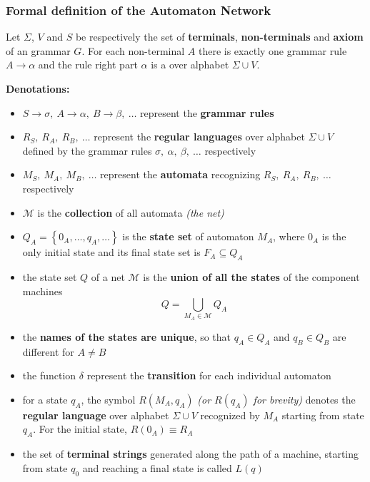 \documentclass[english]{article}
\begin{document}
\subsubsection{Formal definition of the Automaton Network}

Let \(\Sigma\), \(V\) and \(S\) be respectively the set of \textbf{terminals}, \textbf{non-terminals} and \textbf{axiom} of an \EBNF grammar \(G\).
For each non-terminal \(A\) there is exactly one grammar rule \(A \rightarrow \alpha\) and the rule right part \(\alpha\) is a \re over alphabet \(\Sigma \cup V\).

\textbf{Denotations:}

\begin{itemize}
  \item \(S \rightarrow \sigma, \ A \rightarrow \alpha, \ B \rightarrow \beta, \ \ldots\) represent the \textbf{grammar rules}
  \item \(R_S, \ R_A, \ R_B, \ \ldots\) represent the \textbf{regular languages} over alphabet \(\Sigma \cup V\) defined by the grammar rules \(\sigma, \ \alpha, \ \beta, \ \ldots\) respectively
  \item \(M_S, \ M_A, \ M_B, \ \ldots\) represent the \textbf{automata} recognizing \(R_S, \ R_A, \ R_B, \ \ldots\) respectively
  \item \(\mathcal{M}\) is the \textbf{collection} of all automata \textit{(the net)}
  \item \(Q_A = \left\{ 0_A, \ldots, q_A, \ldots \right\}\) is the \textbf{state set} of automaton \(M_A\), where \(0_A\) is the only initial state and its final state set is \(F_A \subseteq Q_A\)
  \item the state set \(Q\) of a net \(\mathcal{M}\) is the \textbf{union of all the states} of the component machines \[Q = \displaystyle \bigcup_{M_A \in \mathcal{M}} Q_A\]
  \item the \textbf{names of the states are unique}, so that \(q_A \in Q_A\) and \(q_B \in Q_B\) are different for \(A \neq B\)
  \item the function \(\delta\) represent the \textbf{transition} for each individual automaton
  \item for a state \(q_A\), the symbol \(R (M_A, q_A)\) \textit{(or \(R(q_A)\) for brevity)} denotes the \textbf{regular language} over alphabet \(\Sigma \cup V\) recognized by \(M_A\) starting from state \(q_A\). For the initial state, \(R(0_A) \equiv R_A\)
  \item the set of \textbf{terminal strings} generated along the path of a machine, starting from state \(q_0\) and reaching a final state is called \(L(q)\)
\end{itemize}
\end{document}
